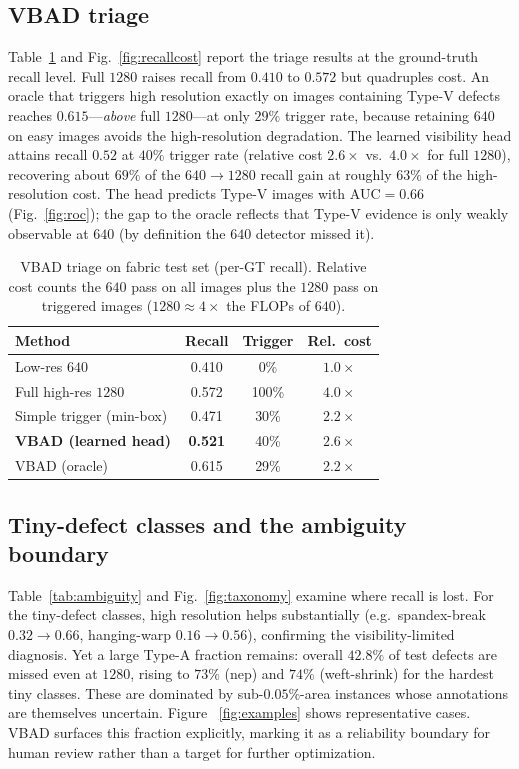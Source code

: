 \subsection{VBAD triage}
Table~\ref{tab:vbad} and Fig.~\ref{fig:recallcost} report the triage results
at the ground-truth recall level. Full $1280$ raises recall from $0.410$ to $0.572$ but quadruples cost.
An oracle that triggers high resolution exactly on images containing Type-V
defects reaches $0.615$---\emph{above} full $1280$---at only $29\%$ trigger
rate, because retaining $640$ on easy images avoids the high-resolution
degradation. The learned visibility head attains recall $0.52$ at $40\%$
trigger rate (relative cost $2.6\times$ vs.\ $4.0\times$ for full $1280$),
recovering about $69\%$ of the $640{\to}1280$ recall gain at roughly $63\%$ of
the high-resolution cost. The head predicts Type-V images with
AUC${=}0.66$ (Fig.~\ref{fig:roc}); the gap to the oracle reflects that Type-V evidence is only
weakly observable at $640$ (by definition the $640$ detector missed it).

\begin{table}[t]
\centering
\caption{VBAD triage on fabric test set (per-GT recall). Relative cost
counts the $640$ pass on all images plus the $1280$ pass on triggered images
($1280 {\approx} 4{\times}$ the FLOPs of $640$).}
\label{tab:vbad}
\begin{tabular}{lccc}
\toprule
Method & Recall & Trigger & Rel.\ cost \\
\midrule
Low-res $640$            & 0.410 & 0\%    & $1.0\times$ \\
Full high-res $1280$     & 0.572 & 100\%  & $4.0\times$ \\
Simple trigger (min-box) & 0.471 & 30\%   & $2.2\times$ \\
\textbf{VBAD (learned head)} & \textbf{0.521} & 40\% & $2.6\times$ \\
VBAD (oracle)            & 0.615 & 29\%   & $2.2\times$ \\
\bottomrule
\end{tabular}
\end{table}

\subsection{Tiny-defect classes and the ambiguity boundary}
Table~\ref{tab:ambiguity} and Fig.~\ref{fig:taxonomy} examine where recall is lost. For the tiny-defect
classes, high resolution helps substantially (e.g.\ spandex-break
$0.32{\to}0.66$, hanging-warp $0.16{\to}0.56$), confirming the
visibility-limited diagnosis. Yet a large Type-A fraction remains: overall
$42.8\%$ of test defects are missed even at $1280$, rising to $73\%$ (nep) and
$74\%$ (weft-shrink) for the hardest tiny classes. These are dominated by
sub-$0.05\%$-area instances whose annotations are themselves uncertain. Figure~
\ref{fig:examples} shows representative cases. VBAD
surfaces this fraction explicitly, marking it as a reliability boundary for
human review rather than a target for further optimization.

